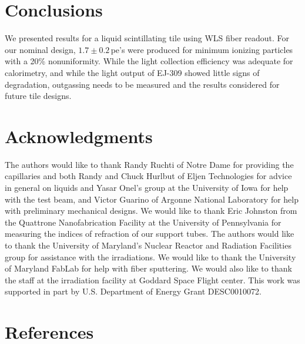 \documentclass[review]{elsarticle}
\begin{document}
\section{Conclusions}

We presented results for a liquid scintillating tile using WLS fiber readout. For our nominal design, $1.7\pm 0.2$\,pe's
were produced for minimum ionizing particles with a 20\% nonuniformity.
While the light collection efficiency was adequate for calorimetry, and while the light output of EJ-309 showed little signs of degradation, outgassing needs to be measured and the results considered for future tile designs.

\section{Acknowledgments}
The authors would like to thank Randy Ruchti of Notre Dame for
providing the capillaries and both Randy and Chuck Hurlbut of Eljen
Technologies for
advice in general on liquids and
Yasar Onel's group at the University of
Iowa for help with the test beam, and Victor Guarino of Argonne National Laboratory for
help with preliminary mechanical designs.
We would like to thank Eric
Johnston from the Quattrone Nanofabrication Facility at the University
of Pennsylvania for measuring the indices of refraction of our support
tubes. 
The authors would like to thank 
the University of Maryland's Nuclear Reactor and Radiation
Facilities group for assistance
with the irradiations.
 We would like to thank the University of Maryland
FabLab for help with fiber sputtering.
We would also like to thank the staff at the irradiation facility at Goddard Space Flight center.
This work was supported in part by U.S. Department of Energy
Grant DESC0010072.

\section*{References}


\end{document}
